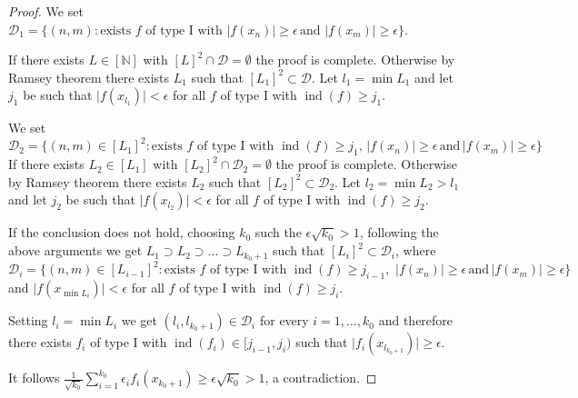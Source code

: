 \documentclass[a4paper]{amsart}
\theoremstyle{plain}
\newcommand{\N}{\mathbb{N}}
\newcommand{\e}{\epsilon}
\DeclareMathOperator{\ind}{ind}
\begin{document}
\begin{proof}
 We set
$
\mathcal{D}_{1}=\{(n,m):\text{exists $f$ of type I with}\,\, \vert f(x_n)\vert\geq\e\,\text{and}\,\,\vert f(x_m)\vert\geq\e\}.
$

If there exists  $L\in [\N]$ with
$[L]^{2}\cap\mathcal{D}=\emptyset$ the proof is complete.
Otherwise by Ramsey theorem there exists $L_{1}$ such that
$[L_1]^{2}\subset\mathcal{D}$. Let $l_1=\min L_1$ and let $j_{1}$
be such that $\vert f(x_{l_1})\vert<\e$ for all $f$ of type I with
$\ind(f)\geq j_{1}$.

We set
$$
\mathcal{D}_{2}=\{(n,m)\in [L_1]^{2}:\text{exists $f$ of type I with  $\ind(f)\geq j_1$},\, \vert f(x_n)\vert\geq\e\,\text{and}\,\vert f(x_m)\vert\geq\e\}
$$
If there exists $L_{2}\in [L_1]$ with
$[L_{2}]^{2}\cap\mathcal{D}_{2}=\emptyset$ the proof is complete.
Otherwise by Ramsey theorem there exists $L_{2}$ such that
$[L_2]^{2}\subset\mathcal{D}_{2}$. Let $l_2=\min L_{2}>l_{1}$ and
let $j_{2}$ be such that $\vert f(x_{l_2})\vert<\e$ for all $f$ of
type I with $\ind(f)\geq j_{2}$.

If the conclusion does not hold, choosing $k_0$ such the
$\e\sqrt{k_0}>1$,  following the above arguments we get
$L_{1}\supset L_{2}\supset\dots \supset L_{k_0+1}$ such that
$[L_{i}]^{2}\subset \mathcal{D}_{i}$, where
$$
\mathcal{D}_{i}=\{(n,m)\in [L_{i-1}]^{2}:\text{exists $f$ of type I with  $\ind(f)\geq j_{i-1}$},\,\, \vert f(x_n)\vert\geq\e\,\text{and}\,\vert f(x_m)\vert\geq\e\}
$$
and    $\vert f(x_{\min  L_{i}})\vert<\e$ for all $f$ of type I with $\ind(f)\geq j_{i}$.

Setting $l_{i}=\min L_{i}$ we get
$(l_{i},l_{k_0+1})\in\mathcal{D}_{i}$ for every $i=1,\dots,k_0$
and therefore there exists  $f_{i}$ of type I with $\ind(f_{i})\in
[j_{i-1},j_{i})$ such that $\vert
f_{i}(x_{l_{k_0+1}})\vert\geq \e$.

It follows $\frac{1}{\sqrt{k_{0}}}\sum_{i=1}^{k_0}\e_{i}f_{i}(x_{k_0+1})\geq \e\sqrt{k_0}>1$, a contradiction.
\end{proof}
\end{document}
